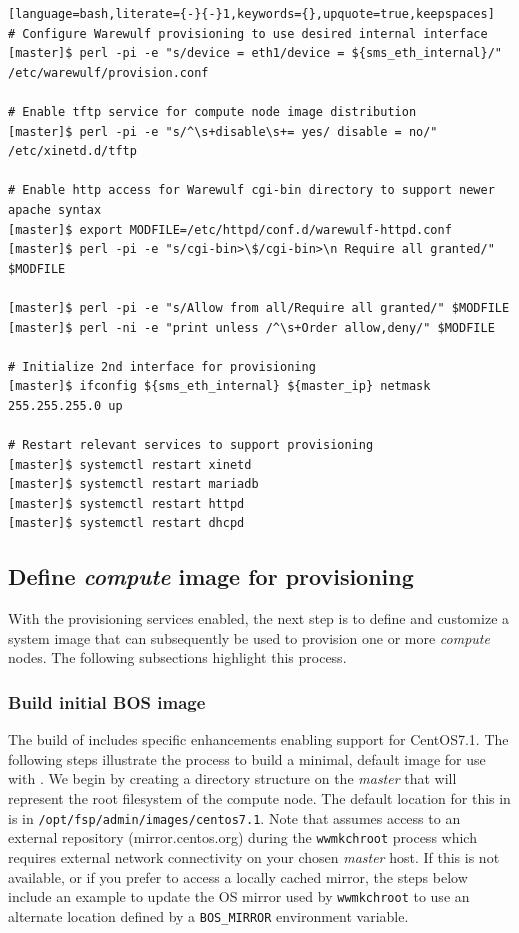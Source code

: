 \documentclass[letterpaper]{article}
\newcommand{\baseOS}{CentOS7.1}
\begin{document}
\begin{lstlisting}[language=bash,literate={-}{-}1,keywords={},upquote=true,keepspaces]
# Configure Warewulf provisioning to use desired internal interface
[master]$ perl -pi -e "s/device = eth1/device = ${sms_eth_internal}/" /etc/warewulf/provision.conf

# Enable tftp service for compute node image distribution
[master]$ perl -pi -e "s/^\s+disable\s+= yes/ disable = no/" /etc/xinetd.d/tftp

# Enable http access for Warewulf cgi-bin directory to support newer apache syntax
[master]$ export MODFILE=/etc/httpd/conf.d/warewulf-httpd.conf
[master]$ perl -pi -e "s/cgi-bin>\$/cgi-bin>\n Require all granted/" $MODFILE

[master]$ perl -pi -e "s/Allow from all/Require all granted/" $MODFILE
[master]$ perl -ni -e "print unless /^\s+Order allow,deny/" $MODFILE

# Initialize 2nd interface for provisioning
[master]$ ifconfig ${sms_eth_internal} ${master_ip} netmask 255.255.255.0 up

# Restart relevant services to support provisioning
[master]$ systemctl restart xinetd  
[master]$ systemctl restart mariadb 
[master]$ systemctl restart httpd   
[master]$ systemctl restart dhcpd
\end{lstlisting}


\subsection{Define {\em compute} image for provisioning}

With the provisioning services enabled, the next step is to define and
customize a system image that can subsequently be used to provision one or more
{\em compute} nodes. The following subsections highlight this process.

\subsubsection{Build initial BOS image} \label{sec:assemble_bos}

The \FSP{} build of \Warewulf{} includes specific enhancements enabling support for
\baseOS{}. The following steps illustrate the process to build a minimal, default
image for use with \Warewulf{}.  We begin by creating a directory structure on the 
{\em master} that will represent the root filesystem of the compute node. The 
default location for this in \FSP{} is in
\texttt{/opt/fsp/admin/images/centos7.1}. Note that \Warewulf{} assumes access to
an external repository (mirror.centos.org) during the \texttt{wwmkchroot}
process which requires external network connectivity on your chosen {\em
  master} host. If this is not available, or if you prefer to access a locally cached
mirror, the steps below include an example to update the OS mirror used by
\texttt{wwmkchroot} to use an alternate location defined by a
\texttt{BOS\_MIRROR} environment variable.
\end{document}

